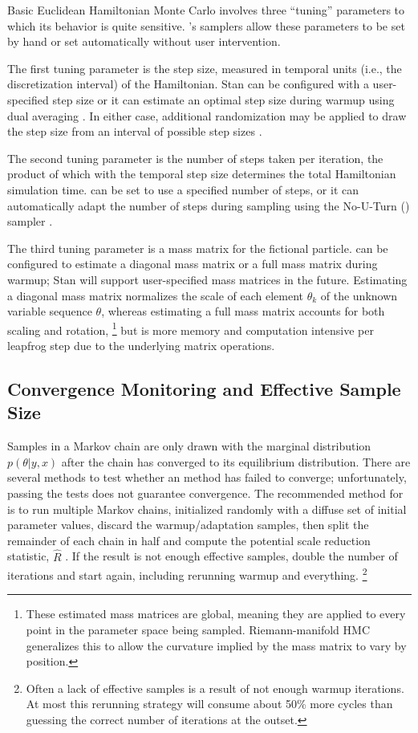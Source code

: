 Basic Euclidean Hamiltonian Monte Carlo involves three ``tuning''
parameters to which its behavior is quite sensitive.  \Stan's samplers
allow these parameters to be set by hand or set automatically without
user intervention.

The first tuning parameter is the step size, measured in temporal
units (i.e., the discretization interval) of the Hamiltonian.  Stan
can be configured with a user-specified step size or it can estimate
an optimal step size during warmup using dual averaging
\citep{Nesterov:2009, Hoffman-Gelman:2011, Hoffman-Gelman:2014}.  In
either case, additional randomization may be applied to draw the step
size from an interval of possible step sizes \citep{Neal:2011}.

The second tuning parameter is the number of steps taken per
iteration, the product of which with the temporal step size determines
the total Hamiltonian simulation time.  \Stan can be set to use a
specified number of steps, or it can automatically adapt the number of
steps during sampling using the No-U-Turn (\NUTS) sampler
\citep{Hoffman-Gelman:2011, Hoffman-Gelman:2014}.

The third tuning parameter is a mass matrix for the fictional
particle.  \Stan can be configured to estimate a diagonal mass matrix
or a full mass matrix during warmup; Stan will support user-specified
mass matrices in the future.  Estimating a diagonal mass matrix
normalizes the scale of each element $\theta_k$ of the unknown
variable sequence $\theta$, whereas estimating a full mass matrix
accounts for both scaling and rotation,%
%
\footnote{These estimated mass matrices are global, meaning they are
  applied to every point in the parameter space being sampled.
  Riemann-manifold HMC generalizes this to allow the curvature implied
  by the mass matrix to vary by position.}
%
but is more memory and computation intensive per leapfrog step due to
the underlying matrix operations.

\subsection{Convergence Monitoring and Effective Sample Size}

Samples in a Markov chain are only drawn with the marginal
distribution $p(\theta|y,x)$ after the chain has converged to its
equilibrium distribution.  There are several methods to test whether
an \MCMC method has failed to converge; unfortunately, passing the
tests does not guarantee convergence.  The recommended method for
\Stan is to run multiple Markov chains, initialized randomly with a
diffuse set of initial parameter values, discard the warmup/adaptation
samples, then split the remainder of each chain in half and compute
the potential scale reduction statistic, $\hat{R}$
\citep{GelmanRubin:1992}.  If the result is not enough effective
samples, double the number of iterations and start again, including
rerunning warmup and everything.%
%
\footnote{Often a lack of effective samples is a result of not enough
  warmup iterations.  At most this rerunning strategy will consume
  about 50\% more cycles than guessing the correct number of
  iterations at the outset.}
  
